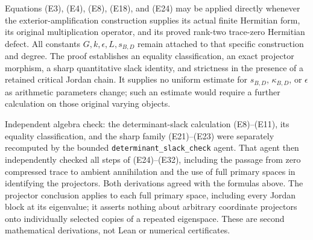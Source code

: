 Equations (E3), (E4), (E8), (E18), and (E24) may be applied directly whenever the exterior-amplification construction supplies its actual finite Hermitian form, its original multiplication operator, and its proved rank-two trace-zero Hermitian defect. All constants \(G,k,\epsilon,L,s_{B,D}\) remain attached to that specific construction and degree. The proof establishes an equality classification, an exact projector morphism, a sharp quantitative slack identity, and strictness in the presence of a retained critical Jordan chain. It supplies no uniform estimate for \(s_{B,D}\), \(\kappa_{B,D}\), or \(\epsilon\) as arithmetic parameters change; such an estimate would require a further calculation on those original varying objects.

Independent algebra check: the determinant-slack calculation (E8)--(E11), its equality classification, and the sharp family (E21)--(E23) were separately recomputed by the bounded \texttt{determinant\_slack\_check} agent. That agent then independently checked all steps of (E24)--(E32), including the passage from zero compressed trace to ambient annihilation and the use of full primary spaces in identifying the projectors. Both derivations agreed with the formulas above. The projector conclusion applies to each full primary space, including every Jordan block at its eigenvalue; it asserts nothing about arbitrary coordinate projectors onto individually selected copies of a repeated eigenspace. These are second mathematical derivations, not Lean or numerical certificates.
